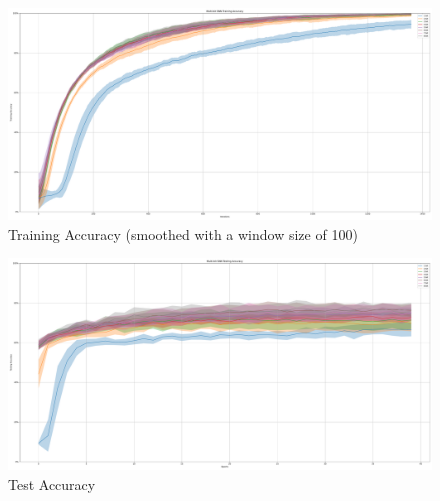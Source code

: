         \begin{figure}[H]
            \centering
            \includegraphics[width=\textwidth]{../standard/DVSGesture/plots/dvsgesture_train_acc.pdf}
            \caption{Training Accuracy (smoothed with a window size of 100)}
        \end{figure}
        \begin{figure}[H]
            \centering
            \includegraphics[width=\textwidth]{../standard/DVSGesture/plots/dvsgesture_test_acc.pdf}
            \caption{Test Accuracy}
        \end{figure}
